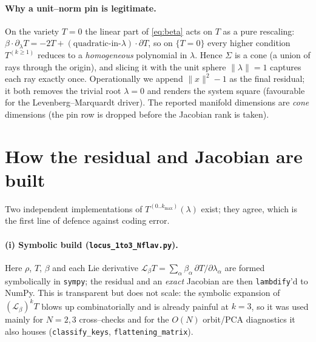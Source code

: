 \documentclass[11pt]{article}
\newcommand{\Lie}{\mathcal{L}}
\newcommand{\norm}[1]{\lVert #1\rVert}
\newcommand{\code}[1]{\texttt{#1}}
\begin{document}
\paragraph{Why a unit--norm pin is legitimate.}
On the variety $T=0$ the linear part of \eqref{eq:beta} acts on $T$ as a pure
rescaling: $\beta\!\cdot\!\partial_\lambda T = -2T + (\text{quadratic-in-}\lambda)\!\cdot\!\partial T$,
so on $\{T=0\}$ every higher condition $T^{(k\ge1)}$ reduces to a
\emph{homogeneous} polynomial in $\lambda$. Hence $\Sigma$ is a cone (a union of
rays through the origin), and slicing it with the unit sphere
$\norm{\lambda}=1$ captures each ray exactly once. Operationally we append
$\norm{x}^2-1$ as the final residual; it both removes the trivial root
$\lambda=0$ and renders the system square (favourable for the
Levenberg--Marquardt driver). The reported manifold dimensions are
\emph{cone} dimensions (the pin row is dropped before the Jacobian rank is
taken).

\section{How the residual and Jacobian are built}
\label{sec:residual}

Two independent implementations of $T^{(0..k_{\max})}(\lambda)$ exist; they
agree, which is the first line of defence against coding error.

\paragraph{(i) Symbolic build (\code{locus\_1to3\_Nflav.py}).}
Here $\rho$, $T$, $\beta$ and each Lie derivative
$\Lie_\beta T=\sum_\alpha\beta_\alpha\,\partial T/\partial\lambda_\alpha$ are
formed symbolically in \code{sympy}; the residual and an \emph{exact} Jacobian
are then \code{lambdify}'d to NumPy. This is transparent but does not scale:
the symbolic expansion of $(\Lie_\beta)^k T$ blows up combinatorially and is
already painful at $k=3$, so it was used mainly for $N=2,3$ cross--checks and
for the $O(N)$ orbit/PCA diagnostics it also houses (\code{classify\_keys},
\code{flattening\_matrix}).
\end{document}
